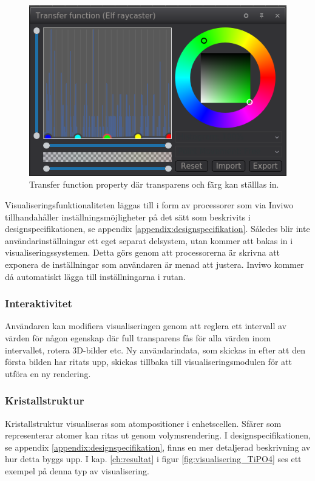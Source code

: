 \documentclass[a4paper,12pt]{article}
\begin{document}
\begin{figure}[H]
	\centering
	\includegraphics[scale=0.55]{transferfunction_elf.png}
	\caption{Transfer function property där transparens och färg kan ställlas in.}
	\label{fig:transferfunction}
\end{figure}

Visualiseringsfunktionaliteten läggas till i form av processorer som via Inviwo tillhandahåller inställningsmöjligheter på det sätt som beskrivits i designspecifikationen, se appendix \ref{appendix:designspecifikation}. Således blir inte användarinställningar ett eget separat delsystem, utan kommer att bakas in i visualiseringssystemen. Detta görs genom att processorerna är skrivna att exponera de inställningar som användaren är menad att
justera. Inviwo kommer då automatiskt lägga till inställningarna i rutan.

\subsubsection{Interaktivitet}
Användaren kan modifiera visualiseringen genom att reglera ett intervall av värden för
någon egenskap där full transparens fås för alla värden inom intervallet, rotera 3D-bilder etc.
Ny användarindata, som skickas in efter att den första bilden har ritats upp, skickas tillbaka till
visualiseringsmodulen för att utföra en ny rendering. 

\subsubsection{Kristallstruktur}
Kristallstruktur visualiseras som atompositioner i enhetscellen. Sfärer som representerar atomer  kan  ritas  ut  genom  volymsrendering. %
I designspecifikationen, se appendix \ref{appendix:designspecifikation}, finns en mer detaljerad beskrivning av
hur detta byggs upp. I kap. \ref{ch:resultat} i figur \ref{fig:visualisering_TiPO4} ses ett exempel på denna typ av visualisering.
\end{document}

